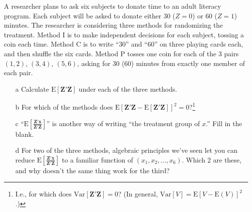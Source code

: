 A researcher plans to ask six subjects to donate time to an adult
literacy program. Each subject will be asked to donate either 30
($Z=0$) or 60 ($Z=1$)
minutes. The researcher is considering three methods for randomizing
the treatment. Method I is to make independent decisions for each
subject, tossing a coin each time. Method C is to
write ``30'' and ``60'' on three playing cards each, and then shuffle
the six cards. Method P tosses one coin for each of the 3 pairs
$(1,2)$, $(3,4)$, $(5,6)$, asking for 30 (60) minutes from exactly one
member of each pair. 

\begin{itemize}
\item[a] Calculate $\mathrm{E}\left[\mathbf{Z}'\mathbf{Z}\right]$ under each of the three methods.
\item[b] For which of the methods does $\mathrm{E}
  \left[\mathbf{Z}'\mathbf{Z} -\mathrm{E} \left[\mathbf{Z}'\mathbf{Z}\right]\right]^{2} =
  0$?\footnote{I.e., for which does
    $\mathrm{Var}\left[\mathbf{Z}'\mathbf{Z}\right] = 0$?  (In general,
    $\mathrm{Var}\left[V\right] = \mathrm{E} \left[V - \mathrm{E}(V) \right]^{2} $.)}
\item[c] ``$\mathrm{E} \left[\frac{\mathbf{Z}'\mathbf{x}}{\mathbf{Z}'\mathbf{Z}}\right]$''
  is another way of writing ``the treatment group
  \underline{\hspace{3em}} of $x$.''  Fill in the blank.
\item[d] For two of the three methods, algebraic principles we've seen
  let you can reduce
  $\mathrm{E} \left[\frac{\mathbf{Z}'\mathbf{x}}{\mathbf{Z}'\mathbf{Z}}\right]$ to a
  familiar function of $(x_{1}, x_{2}, \ldots, x_{6}) $.  Which 2 are
  these, and why doesn't the same thing work for the third?
\end{itemize}
